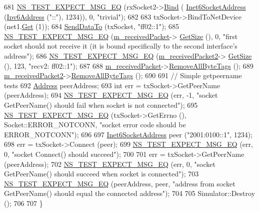 \begin{DoxyCode}
681   \hyperlink{group__testing_ga7304ba46a28d8cf08dfdfd6499cf7068}{NS\_TEST\_EXPECT\_MSG\_EQ} (rxSocket2->\hyperlink{classns3_1_1Socket_ada93439a43de2028b5a8fc6621dad482}{Bind} (
      \hyperlink{classns3_1_1Inet6SocketAddress}{Inet6SocketAddress} (\hyperlink{classns3_1_1Ipv6Address}{Ipv6Address} (\textcolor{stringliteral}{"::"}), 1234)), 0, \textcolor{stringliteral}{"trivial"});
682 
683   txSocket->BindToNetDevice (net1.\hyperlink{classns3_1_1NetDeviceContainer_a677d62594b5c9d2dea155cc5045f4d0b}{Get} (1));
684   \hyperlink{classUdp6SocketImplTest_a427d2e3289403cb472bd8414114d2894}{SendDataTo} (txSocket, \textcolor{stringliteral}{"ff02::1"});
685   \hyperlink{group__testing_ga7304ba46a28d8cf08dfdfd6499cf7068}{NS\_TEST\_EXPECT\_MSG\_EQ} (\hyperlink{classUdp6SocketImplTest_a0fe42d497152d2bbfa1660fbe5078c8a}{m\_receivedPacket}->
      \hyperlink{classns3_1_1Packet_a462855c9929954d4301a4edfe55f4f1c}{GetSize} (), 0, \textcolor{stringliteral}{"first socket should not receive it (it is bound specifically to the second
       interface's address"});
686   \hyperlink{group__testing_ga7304ba46a28d8cf08dfdfd6499cf7068}{NS\_TEST\_EXPECT\_MSG\_EQ} (\hyperlink{classUdp6SocketImplTest_a7bd5d6c237574c130414e505553bd13b}{m\_receivedPacket2}->
      \hyperlink{classns3_1_1Packet_a462855c9929954d4301a4edfe55f4f1c}{GetSize} (), 123, \textcolor{stringliteral}{"recv2: ff02::1"});
687 
688   \hyperlink{classUdp6SocketImplTest_a0fe42d497152d2bbfa1660fbe5078c8a}{m\_receivedPacket}->\hyperlink{classns3_1_1Packet_a083f54c9db31aeff30551a9e20fcda42}{RemoveAllByteTags} ();
689   \hyperlink{classUdp6SocketImplTest_a7bd5d6c237574c130414e505553bd13b}{m\_receivedPacket2}->\hyperlink{classns3_1_1Packet_a083f54c9db31aeff30551a9e20fcda42}{RemoveAllByteTags} ();
690 
691   \textcolor{comment}{// Simple getpeername tests}
692   \hyperlink{classns3_1_1Address}{Address} peerAddress;
693   \textcolor{keywordtype}{int} err = txSocket->GetPeerName (peerAddress);
694   \hyperlink{group__testing_ga7304ba46a28d8cf08dfdfd6499cf7068}{NS\_TEST\_EXPECT\_MSG\_EQ} (err, -1, \textcolor{stringliteral}{"socket GetPeerName() should fail when socket is not
       connected"});
695   \hyperlink{group__testing_ga7304ba46a28d8cf08dfdfd6499cf7068}{NS\_TEST\_EXPECT\_MSG\_EQ} (txSocket->GetErrno (), Socket::ERROR\_NOTCONN, \textcolor{stringliteral}{"socket error
       code should be ERROR\_NOTCONN"});
696 
697   \hyperlink{classns3_1_1Inet6SocketAddress}{Inet6SocketAddress} peer (\textcolor{stringliteral}{"2001:0100::1"}, 1234);
698   err = txSocket->Connect (peer);
699   \hyperlink{group__testing_ga7304ba46a28d8cf08dfdfd6499cf7068}{NS\_TEST\_EXPECT\_MSG\_EQ} (err, 0, \textcolor{stringliteral}{"socket Connect() should succeed"});
700 
701   err = txSocket->GetPeerName (peerAddress);
702   \hyperlink{group__testing_ga7304ba46a28d8cf08dfdfd6499cf7068}{NS\_TEST\_EXPECT\_MSG\_EQ} (err, 0, \textcolor{stringliteral}{"socket GetPeerName() should succeed when socket is
       connected"});
703   \hyperlink{group__testing_ga7304ba46a28d8cf08dfdfd6499cf7068}{NS\_TEST\_EXPECT\_MSG\_EQ} (peerAddress, peer, \textcolor{stringliteral}{"address from socket GetPeerName() should
       equal the connected address"});
704 
705   Simulator::Destroy ();
706 
707 \}
\end{DoxyCode}


